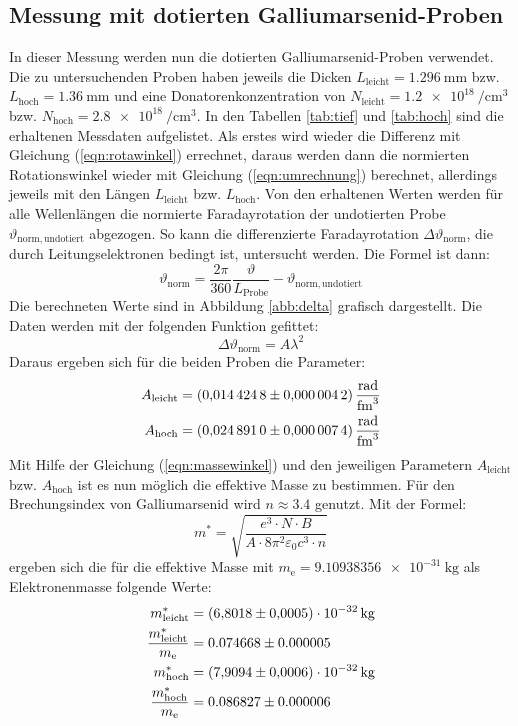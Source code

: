 \subsection{Messung mit dotierten Galliumarsenid-Proben}
\label{sec:dot}
In dieser Messung werden nun die dotierten Galliumarsenid-Proben verwendet.
Die zu untersuchenden Proben haben jeweils die Dicken $L_{\mathrm{leicht}}=\SI{1.296}{\milli\meter}$ bzw. $L_{\mathrm{hoch}}=\SI{1.36}{\milli\meter}$ und eine Donatorenkonzentration von $N_{\mathrm{leicht}}=\SI{1.2 e18}{\per\centi\cubic\meter}$ bzw. $N_{\mathrm{hoch}}=\SI{2.8 e18}{\per\centi\cubic\meter}$.
In den Tabellen \ref{tab:tief} und \ref{tab:hoch} sind die erhaltenen Messdaten aufgelistet.
Als erstes wird wieder die Differenz mit Gleichung (\ref{eqn:rotawinkel}) errechnet, daraus werden dann die normierten Rotationswinkel wieder mit Gleichung (\ref{eqn:umrechnung}) berechnet, allerdings jeweils mit den Längen $L_{\mathrm{leicht}}$ bzw. $L_{\mathrm{hoch}}$.
Von den erhaltenen Werten werden für alle Wellenlängen die normierte Faradayrotation der undotierten Probe $\vartheta_\mathrm{norm,undotiert}$ abgezogen.
So kann die differenzierte Faradayrotation $\Delta\vartheta_\mathrm{norm}$, die durch Leitungselektronen bedingt ist, untersucht werden.
Die Formel ist dann:
\begin{equation}
    \vartheta_\mathrm{norm}=\dfrac{2\pi}{360}\dfrac{\vartheta}{L_\mathrm{Probe}}-\vartheta_\mathrm{norm,undotiert}
\end{equation}
Die berechneten Werte sind in Abbildung \ref{abb:delta} grafisch dargestellt.
Die Daten werden mit der folgenden Funktion gefittet:
\begin{equation}
  \Delta\vartheta_{\mathrm{norm}} = A\lambda^2
\end{equation}
Daraus ergeben sich für die beiden Proben die Parameter:
\begin{align*}
  A_{\mathrm{leicht}} &= \SI{0.0144248 \pm 0.0000042}{\radian\per\femto\cubic\meter} \\
  A_{\mathrm{hoch}} &= \SI{0.0248910 \pm 0.0000074}{\radian\per\femto\cubic\meter}
\end{align*}
Mit Hilfe der Gleichung (\ref{eqn:massewinkel}) und den jeweiligen Parametern $A_{\mathrm{leicht}}$ bzw. $A_{\mathrm{hoch}}$ ist es nun möglich die effektive Masse zu bestimmen.
Für den Brechungsindex von Galliumarsenid wird $n \approx 3.4$ \cite{nGaAs} genutzt.
Mit der Formel:
\begin{equation}
  m^*=\sqrt{\frac{e^3\cdot N \cdot B}{A\cdot 8\pi^2\varepsilon_\mathrm{0} c^3 \cdot n }}
\end{equation}
ergeben sich die für die effektive Masse mit $m_\mathrm{e} = \SI{9.10938356 e-31}{\kilogram}$ als Elektronenmasse folgende Werte:
\begin{align*}
  m^*_{\mathrm{leicht}} &= \SI{6.8018 \pm 0.0005 e-32}{\kilogram} \\
  \dfrac{m^*_{\mathrm{leicht}}}{m_\mathrm{e}} &= 0.074668 \pm 0.000005 \\
  m^*_{\mathrm{hoch}} &= \SI{7.9094 \pm 0.0006 e-32}{\kilogram} \\
  \dfrac{m^*_{\mathrm{hoch}}}{m_\mathrm{e}} &= 0.086827 \pm 0.000006
\end{align*}

